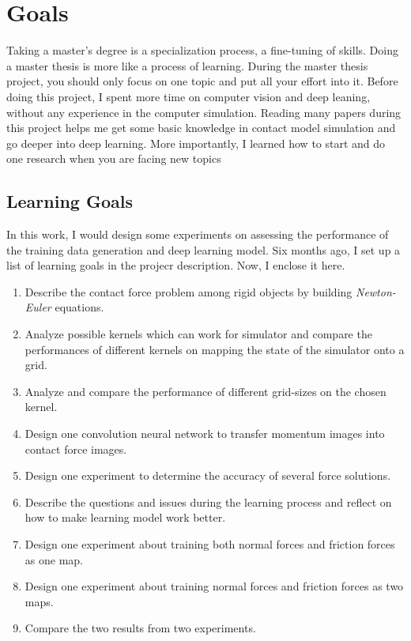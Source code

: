 \section{Goals}
    Taking a master’s degree is a specialization process, a fine-tuning of skills. Doing a master thesis is more like a process of learning. During the master thesis project, you should only focus on one topic and put all your effort into it. Before doing this project, I spent more time on computer vision and deep leaning, without any experience in the computer simulation. Reading many papers during this project helps me get some basic knowledge in contact model simulation and go deeper into deep learning. More importantly, I learned how to start and do one research when you are facing new topics 

    \subsection{Learning Goals}
    In this work, I would design some experiments on assessing the performance of the training data generation and deep learning model. Six months ago, I set up a list of learning goals in the projecr description. Now, I enclose it here. 
    \begin{enumerate}
        \item Describe the contact force problem among rigid objects by building \textit{Newton-Euler} equations.
        \item Analyze possible kernels which can work for simulator and compare the performances of different kernels on mapping the state of the simulator onto a grid.
        \item Analyze and compare the performance of different grid-sizes on the chosen kernel. 
        \item Design one convolution neural network to transfer momentum images into contact force images.
        \item Design one experiment to determine the accuracy of several force solutions.
        \item Describe the questions and issues during the learning process and reflect on how to make learning model work better.
        \item Design one experiment about training both normal forces and friction forces as one map.
        \item Design one experiment about training normal forces and friction forces as two maps.
        \item Compare the two results from two experiments.
    \end{enumerate}

